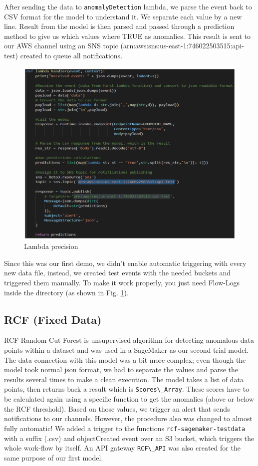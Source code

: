 After sending the data to \verb|anomalyDetection| lambda, we parse the event back to CSV format for the model to understand it. We separate each value by a new line. Result from the model is then parsed and passed through a prediction method to give us which values where TRUE as anomalies. This result is sent to our AWS channel using an SNS topic (arn:aws:sns:us-east-1:746022503515:api-test) created to queue all notifications.
\begin{figure}[h]
    \includegraphics[width=1\textwidth]{images/lambda-precistion.png}
    \caption{Lambda precision}
    \label{fig:lambda_precision}
\end{figure}
Since this was our first demo, we didn't enable automatic triggering with every new data file, instead, we created test events with the needed buckets and triggered them manually. To make it work properly, you just need Flow-Logs inside the directory (as shown in Fig. \ref{fig:lambda_precision}). 
            

\subsection{RCF (Fixed Data)}
RCF Random Cut Forest is unsupervised algorithm for detecting anomalous data points within a dataset and was used in a SageMaker as our second trial model. \\

The data connection with this model was a bit more complex; even though the model took normal json format, we had to separate the values and parse the results several times to make a clean execution. The model takes a list of data points, then returns back a result which is \verb|Scores\_Array|. These scores have to be calculated again using a specific function to get the anomalies (above or below the RCF threshold). Based on those values, we trigger an alert that sends notifications to our channels. However, the procedure also was changed to almost fully automatic! We added a trigger to the functions \verb|rcf-sagemaker-testdata| with a suffix (.csv) and objectCreated event over an S3 bucket, which triggers the whole work-flow by itself. An API gateway \verb|RCF\_API| was also created for the same purpose of our first model.\\

